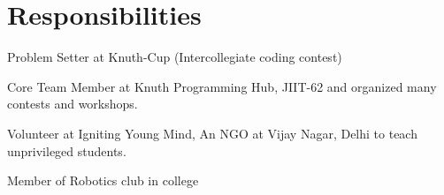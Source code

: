 \documentclass[]{hieudo-build}
\begin{document}
\begin{minipage}[t]{0.69\textwidth}
\section{Responsibilities}

\vspace{0.5em} %
\begin{tightemize}
\item Problem Setter at Knuth-Cup (Intercollegiate coding contest)
\item Core Team Member at Knuth Programming Hub, JIIT-62 and organized many contests and workshops.
\item Volunteer at Igniting Young Mind, An NGO at Vijay Nagar, Delhi to teach unprivileged students.
\item 	Member of Robotics club in college
\end{tightemize}
\sectionsep



\end{minipage} 
\end{document}
